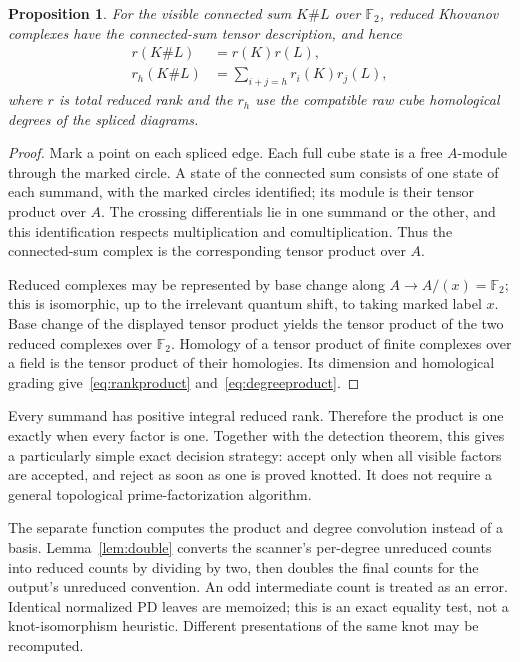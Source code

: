 \documentclass[11pt]{article}
\newtheorem{proposition}[theorem]{Proposition}
\theoremstyle{definition}\newtheorem{definition}[theorem]{Definition}
\theoremstyle{remark}\newtheorem{remark}[theorem]{Remark}
\newcommand{\F}{\mathbb F_2}
\newcommand{\code}[1]{\texttt{\detokenize{#1}}}
\begin{document}
\begin{proposition}\label{prop:tensor}
For the visible connected sum $K\#L$ over $\F$, reduced Khovanov complexes
have the connected-sum tensor description, and hence
\begin{align}
 r(K\#L)&=r(K)r(L),\label{eq:rankproduct}\\
 r_h(K\#L)&=\sum_{i+j=h}r_i(K)r_j(L),\label{eq:degreeproduct}
\end{align}
where $r$ is total reduced rank and the $r_h$ use the compatible raw cube
homological degrees of the spliced diagrams.
\end{proposition}
\begin{proof}
Mark a point on each spliced edge. Each full cube state is a free $A$-module
through the marked circle. A state of the connected sum consists of one state
of each summand, with the marked circles identified; its module is their
tensor product over $A$. The crossing differentials lie in one summand or
the other, and this identification respects multiplication and
comultiplication. Thus the connected-sum complex is the corresponding tensor
product over $A$.

Reduced complexes may be represented by base change along $A\to A/(x)=\F$;
this is isomorphic, up to the irrelevant quantum shift, to taking marked
label $x$. Base change of the displayed tensor product yields the tensor
product of the two reduced complexes over $\F$. Homology of a tensor product
of finite complexes over a field is the tensor product of their homologies.
Its dimension and homological grading give~\eqref{eq:rankproduct}
and~\eqref{eq:degreeproduct}.
\end{proof}

Every summand has positive integral reduced rank. Therefore the product is
one exactly when every factor is one. Together with the detection theorem,
this gives a particularly simple exact decision strategy: accept only when
all visible factors are accepted, and reject as soon as one is proved knotted.
It does not require a general topological prime-factorization algorithm.

The separate \code{factorized_khovanov_rank} function computes the product
and degree convolution instead of a basis. Lemma~\ref{lem:double} converts
the scanner's per-degree unreduced counts into reduced counts by dividing
by two, then doubles the final counts for the output's unreduced convention.
An odd intermediate count is treated as an error. Identical normalized PD
leaves are memoized; this is an exact equality test, not a knot-isomorphism
heuristic. Different presentations of the same knot may be recomputed.
\end{document}
